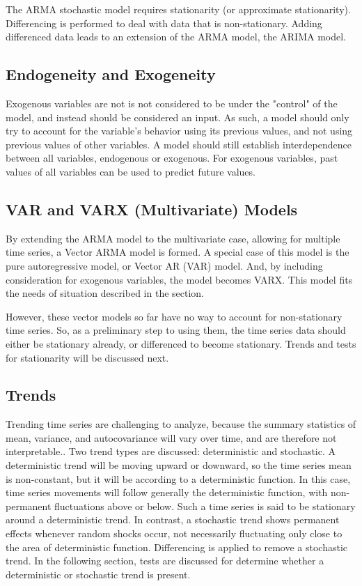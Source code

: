 \documentclass[a4paper]{scrartcl}
\begin{document}
The ARMA stochastic model requires stationarity (or approximate stationarity). Differencing is performed to deal with data that is non-stationary. Adding differenced data leads to an extension of the ARMA model, the ARIMA model.

\subsection*{Endogeneity and Exogeneity}
Exogenous variables are not is not considered to be under the "control" of the model, and instead should be considered an input. As such, a model should only try to account for the variable's behavior using its previous values, and not using previous values of other variables. A model should still establish interdependence between all variables, endogenous or exogenous. For exogenous variables, past values of all variables can be used to predict future values.

\subsection*{VAR and VARX (Multivariate) Models}
By extending the ARMA model to the multivariate case, allowing for multiple time series, a Vector ARMA model is formed. A special case of this model is the pure autoregressive model, or Vector AR (VAR) model. And, by including consideration for exogenous variables, the model becomes VARX. This model fits the needs of situation described in the  section.

However, these vector models so far have no way to account for non-stationary time series. So, as a preliminary step to using them, the time series data should either be stationary already, or differenced to become stationary. Trends and tests for stationarity will be discussed next.

\subsection*{Trends}
Trending time series are challenging to analyze, because the summary statistics of mean, variance, and autocovariance will vary over time, and are therefore not interpretable.\cite{franses1998time}. Two trend types are discussed: deterministic and stochastic. A deterministic trend will be moving upward or downward, so the time series mean is non-constant, but it will be according to a deterministic function. In this case, time series movements will follow generally the deterministic function, with non-permanent fluctuations above or below. Such a time series is said to be stationary around a deterministic trend. In contrast, a stochastic trend shows permanent effects whenever random shocks occur, not necessarily fluctuating only close to the area of deterministic function. Differencing is applied to remove a stochastic trend. In the following section, tests are discussed for determine whether a deterministic or stochastic trend is present.
\end{document}
